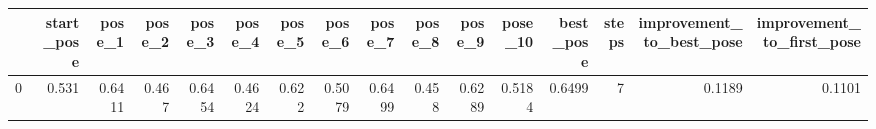 \begin{tabular}{lrrrrrrrrrrrrrrr}
\toprule
{} &  start\_pose &  pose\_1 &  pose\_2 &  pose\_3 &  pose\_4 &  pose\_5 &  pose\_6 &  pose\_7 &  pose\_8 &  pose\_9 &  pose\_10 &  best\_pose &  steps &  improvement\_to\_best\_pose &  improvement\_to\_first\_pose \\
\midrule
0 &       0.531 &  0.6411 &   0.467 &  0.6454 &  0.4624 &   0.622 &  0.5079 &  0.6499 &   0.458 &  0.6289 &   0.5184 &     0.6499 &      7 &                    0.1189 &                     0.1101 \\
\bottomrule
\end{tabular}
